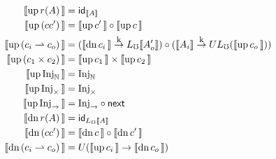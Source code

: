 \begin{figure*}
  \begin{minipage}{0.3\textwidth}
    \begin{footnotesize}
  \begin{align*}
    \sem{\upc{r(A)}} &= \id_{\sem{A}} \\
    \sem{\upc{(c \comp c')}} &= \sem{\upc{c'}} \circ \sem{\upc{c}} \\
    \sem{\upc{(c_i \ra c_o)}} &= (\sem{\dnc {c_i}} \tok \li\sem{A_o'})\circ (\sem{A_i} \tok U\li(\sem{\upc {c_o}}))\\
    \sem{\upc{(c_1 \times c_2)}} &= \sem{\upc{c_1}} \times \sem{\upc{c_2}}\\
    \sem{\upc{\inat}} &= \inat\\
    \sem{\upc{\itimes}} &= \itimes\\
    \sem{\upc{\iarr}} &= \iarr \circ \nxt\\
    \sem{\dnc{r(A)}} &= \id_{\li \sem{A}} \\
    \sem{\dnc{(c \comp c')}} &= \sem{\dnc{c}} \circ \sem{\dnc{c'}} \\
    \sem{\dnc{(c_i \ra c_o)}} &= U(\sem{\upc {c_i}} \to \sem{\dnc {c_o}})\\

\end{align*}
\end{footnotesize}
\end{minipage}
\end{figure*}
